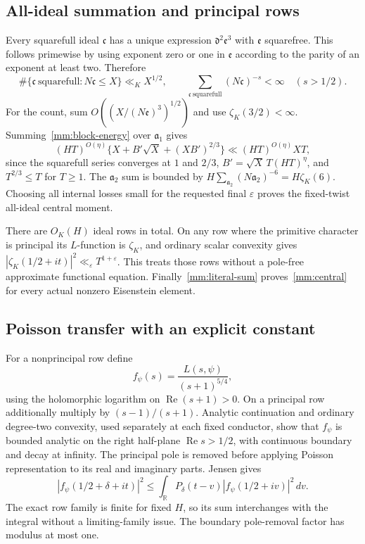 \documentclass[11pt,oneside,openany]{book}
\theoremstyle{definition}\newtheorem{definition}[theorem]{Definition}
\theoremstyle{remark}\newtheorem{remark}[theorem]{Remark}
\begin{document}
\subsection{All-ideal summation and principal rows}
Every squarefull ideal $\mathfrak c$ has a unique expression
$\mathfrak d^2\mathfrak e^3$ with $\mathfrak e$ squarefree.
This follows primewise by using exponent zero or one in $\mathfrak e$
according to the parity of an exponent at least two. Therefore
\[
 \#\{\mathfrak c\ \mathrm{squarefull}:N\mathfrak c\le X\}
 \ll_K X^{1/2},\qquad
 \sum_{\mathfrak c\ \mathrm{squarefull}}(N\mathfrak c)^{-s}<\infty
 \quad(s>1/2).
\]
For the count, sum
$O((X/(N\mathfrak e)^3)^{1/2})$ and use
$\zeta_K(3/2)<\infty$. Summing~\eqref{mm:block-energy} over
$\mathfrak a_1$ gives
\[
 (HT)^{O(\eta)}
 \{X+B'\sqrt X+(XB')^{2/3}\}
 \ll (HT)^{O(\eta)}XT,
\]
since the squarefull series converges at $1$ and $2/3$,
$B'=\sqrt X\,T(HT)^\eta$, and $T^{2/3}\le T$ for $T\ge1$.
The $\mathfrak a_2$ sum is bounded by
$H\sum_{\mathfrak a_2}(N\mathfrak a_2)^{-6}=H\zeta_K(6)$.
Choosing all internal losses small for the requested final
$\varepsilon$ proves the fixed-twist all-ideal central moment.

There are $O_K(H)$ ideal rows in total. On any row where the primitive
character is principal its $L$-function is $\zeta_K$, and ordinary
scalar convexity gives
$|\zeta_K(1/2+it)|^2\ll_\varepsilon T^{1+\varepsilon}$.
This treats those rows without a pole-free approximate functional
equation. Finally~\eqref{mm:literal-sum} proves~\eqref{mm:central}
for every actual nonzero Eisenstein element.

\subsection{Poisson transfer with an explicit constant}
For a nonprincipal row define
\[
 f_\psi(s)=\frac{L(s,\psi)}{(s+1)^{5/4}},
\]
using the holomorphic logarithm on $\operatorname{Re}(s+1)>0$.
On a principal row additionally multiply by $(s-1)/(s+1)$.
Analytic continuation and ordinary degree-two convexity, used separately
at each fixed conductor, show that $f_\psi$ is bounded analytic on the
right half-plane $\operatorname{Re}s>1/2$, with continuous boundary
and decay at infinity. The principal pole is removed before applying
Poisson representation to its real and imaginary parts. Jensen gives
\[
 |f_\psi(1/2+\delta+it)|^2
 \le\int_{\mathbb R}P_\delta(t-v)
             |f_\psi(1/2+iv)|^2\,dv.
\]
The exact row family is finite for fixed $H$, so its sum interchanges
with the integral without a limiting-family issue. The boundary
pole-removal factor has modulus at most one.
\end{document}
